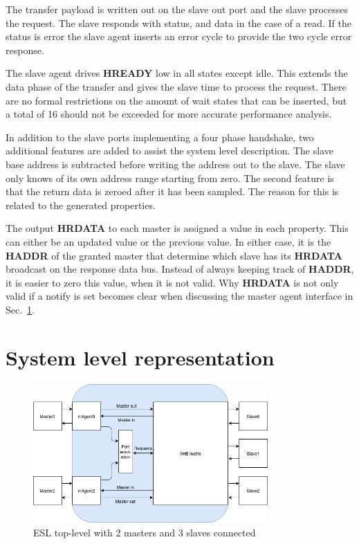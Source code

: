  The transfer payload is written out on the slave out port and the slave processes the request. The slave responds with status, and data in the case of a read. If the status is error the slave agent inserts an error cycle to provide the two cycle error response. \par
The slave agent drives \textbf{HREADY} low in all states except idle. This extends the data phase of the transfer and gives the slave time to process the request. There are no formal restrictions on the amount of wait states that can be inserted, but a total of 16 should not be exceeded for more accurate performance analysis. \par
In addition to the slave ports implementing a four phase handshake, two additional features are added to assist the system level description. The slave base address is subtracted before writing the address out to the slave. The slave only knows of its own address range starting from zero. The second feature is that the return data is zeroed after it has been sampled. The reason for this is related to the generated properties. \par
The output \textbf{HRDATA} to each master is assigned a value in each property. This can either be an updated value or the previous value. In either case, it is the \textbf{HADDR} of the granted master that determine which slave has its \textbf{HRDATA} broadcast on the response data bus. Instead of always keeping track of \textbf{HADDR}, it is easier to zero this value, when it is not valid. Why \textbf{HRDATA} is not only valid if a notify is set becomes clear when discussing the master agent interface in Sec.~\ref{sec:syslev}.   
\newpage

\section{System level representation}
\label{sec:syslev}
\begin{figure}[hbt]
    \begin{center}
        \includegraphics[width=0.8\textwidth]{figs/ESL/Syslev.png}
    \end{center}
    \caption{ESL top-level with 2 masters and 3 slaves connected}
    \label{fig:esl_toplev}
\end{figure}

